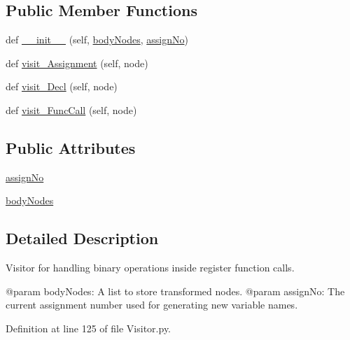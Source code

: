 \subsection*{Public Member Functions}
\begin{DoxyCompactItemize}
\item 
def \hyperlink{classPostProcessor_1_1Visitor_1_1BinaryOpInRegHandler_a3328eb3718a1907a8a24087b075a2062}{\+\_\+\+\_\+init\+\_\+\+\_\+} (self, \hyperlink{classPostProcessor_1_1Visitor_1_1BinaryOpInRegHandler_afde190707204b09a99ff642a6afa5695}{body\+Nodes}, \hyperlink{classPostProcessor_1_1Visitor_1_1BinaryOpInRegHandler_a58eaabd0374c4bb1e31a844d27cc020e}{assign\+No})
\item 
def \hyperlink{classPostProcessor_1_1Visitor_1_1BinaryOpInRegHandler_adae6ad6f5b94c4acd95924bb3df9ebc8}{visit\+\_\+\+Assignment} (self, node)
\item 
def \hyperlink{classPostProcessor_1_1Visitor_1_1BinaryOpInRegHandler_a6568bead87923bbcaa593e5f226920f0}{visit\+\_\+\+Decl} (self, node)
\item 
def \hyperlink{classPostProcessor_1_1Visitor_1_1BinaryOpInRegHandler_a48e7baeee3968db14598ff72b6be63bd}{visit\+\_\+\+Func\+Call} (self, node)
\end{DoxyCompactItemize}
\subsection*{Public Attributes}
\begin{DoxyCompactItemize}
\item 
\hyperlink{classPostProcessor_1_1Visitor_1_1BinaryOpInRegHandler_a58eaabd0374c4bb1e31a844d27cc020e}{assign\+No}
\item 
\hyperlink{classPostProcessor_1_1Visitor_1_1BinaryOpInRegHandler_afde190707204b09a99ff642a6afa5695}{body\+Nodes}
\end{DoxyCompactItemize}


\subsection{Detailed Description}
\begin{DoxyVerb}Visitor for handling binary operations inside register function calls.

@param bodyNodes: A list to store transformed nodes.
@param assignNo: The current assignment number used for generating new variable names.
\end{DoxyVerb}
 

Definition at line 125 of file Visitor.\+py.



